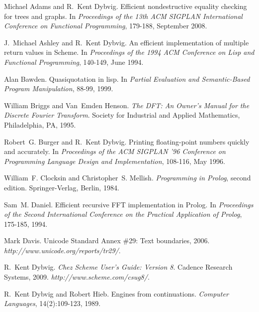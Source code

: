 
\label{bibliography_h0}





Michael Adams and R. Kent Dybvig.
Efficient nondestructive equality checking for trees and graphs.
In \textit{Proceedings of the 13th ACM SIGPLAN International
  Conference on Functional Programming},  179-188, September 2008.


J. Michael Ashley and R. Kent Dybvig.
An efficient implementation of multiple return values in Scheme.
In \textit{Proceedings of the 1994 ACM Conference on Lisp and
  Functional Programming},  140-149, June 1994.


Alan Bawden.
Quasiquotation in lisp.
In \textit{Partial Evaluation and Semantic-Based Program Manipulation},
   88-99, 1999.


William Briggs and Van Emden Henson.
\textit{The DFT: An Owner's Manual for the Discrete Fourier
  Transform}.
Society for Industrial and Applied Mathematics, Philadelphia, PA,
  1995.


Robert G. Burger and R. Kent Dybvig.
Printing floating-point numbers quickly and accurately.
In \textit{Proceedings of the ACM SIGPLAN '96 Conference on
  Programming Language Design and Implementation},  108-116, May 1996.


William F. Clocksin and Christopher S. Mellish.
\textit{Programming in Prolog}, second edition.
Springer-Verlag, Berlin, 1984.


Sam M. Daniel.
Efficient recursive FFT implementation in Prolog.
In \textit{Proceedings of the Second International Conference on the
  Practical Application of Prolog},  175-185, 1994.


Mark Davis.
Unicode Standard Annex \#{}29: Text boundaries, 2006.
 \textit{http://www.unicode.org/reports/tr29/}.
 
R. Kent Dybvig.
\textit{Chez Scheme User's Guide: Version 8}.
Cadence Research Systems, 2009.
 \textit{http://www.scheme.com/csug8/}.
 
R. Kent Dybvig and Robert Hieb.
Engines from continuations.
\textit{Computer Languages}, 14(2):109-123, 1989.


